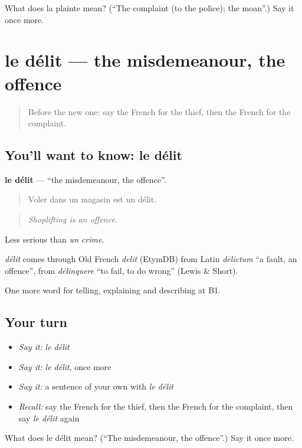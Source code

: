 \begin{tcolorbox}[breakable,colback=teal!4,colframe=teal!35!black,title={Before you move on}]
What does la plainte mean? (\textquotedblleft{}The complaint (to the police); the moan\textquotedblright{}.) Say it once more.
\end{tcolorbox}
\section[le délit]{le délit — the misdemeanour, the offence}

\label{lesson:FR-C386-delit}



\begin{quote}
Before the new one: say the French for the thief, then the French for the complaint.
\end{quote}

\subsection*{You'll want to know: le délit}
\textbf{le délit} — \textquotedblleft{}the misdemeanour, the offence\textquotedblright{}.

\begin{quote}
Voler dans un magasin est un délit.
\end{quote}

\begin{quote}
\emph{Shoplifting is an offence.}
\end{quote}

Less serious than \emph{un crime}.

\begin{cousinweb}
\emph{délit} comes through Old French \emph{delit} (EtymDB) from Latin \emph{dēlictum} \textquotedblleft{}a fault, an offence\textquotedblright{}, from \emph{dēlinquere} \textquotedblleft{}to fail, to do wrong\textquotedblright{} (Lewis \& Short).
\end{cousinweb}

\begin{grammarlens}[title={What you've built}]
One more word for telling, explaining and describing at B1.
\end{grammarlens}

\subsection*{Your turn}
\begin{itemize}
\raggedright
  \item \emph{Say it:} \emph{le délit}
  \item \emph{Say it:} \emph{le délit}, once more
  \item \emph{Say it:} a sentence of your own with \emph{le délit}
  \item \emph{Recall:} say the French for the thief, then the French for the complaint, then say \emph{le délit} again
\end{itemize}

\begin{tcolorbox}[breakable,colback=teal!4,colframe=teal!35!black,title={Before you move on}]
What does le délit mean? (\textquotedblleft{}The misdemeanour, the offence\textquotedblright{}.) Say it once more.
\end{tcolorbox}
